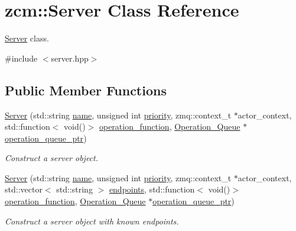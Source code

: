 \hypertarget{classzcm_1_1Server}{\section{zcm\-:\-:Server Class Reference}
\label{classzcm_1_1Server}
}


\hyperlink{classzcm_1_1Server}{Server} class.  




{\ttfamily \#include $<$server.\-hpp$>$}

\subsection*{Public Member Functions}
\begin{DoxyCompactItemize}
\item 
\hyperlink{classzcm_1_1Server_a3b672b6fdb377ffe5f478a9c7916acbb}{Server} (std\-::string \hyperlink{classzcm_1_1Server_a9d59737b196a7abb3a891dc8723e0dcf}{name}, unsigned int \hyperlink{classzcm_1_1Server_ad088a068dc025ff7aa4bf560cc7c43c1}{priority}, zmq\-::context\-\_\-t $\ast$actor\-\_\-context, std\-::function$<$ void()$>$ \hyperlink{classzcm_1_1Server_a98a640c77898790e3ad10b3276e3cba8}{operation\-\_\-function}, \hyperlink{classzcm_1_1Operation__Queue}{Operation\-\_\-\-Queue} $\ast$\hyperlink{classzcm_1_1Server_a667c0fef537aa6acc6245d956250c860}{operation\-\_\-queue\-\_\-ptr})
\begin{DoxyCompactList}\small\item\em Construct a server object. \end{DoxyCompactList}\item 
\hyperlink{classzcm_1_1Server_af1dd8cc020d636884884eaefcdcc857b}{Server} (std\-::string \hyperlink{classzcm_1_1Server_a9d59737b196a7abb3a891dc8723e0dcf}{name}, unsigned int \hyperlink{classzcm_1_1Server_ad088a068dc025ff7aa4bf560cc7c43c1}{priority}, zmq\-::context\-\_\-t $\ast$actor\-\_\-context, std\-::vector$<$ std\-::string $>$ \hyperlink{classzcm_1_1Server_a488d1398b76851565a4d116f7cf72af1}{endpoints}, std\-::function$<$ void()$>$ \hyperlink{classzcm_1_1Server_a98a640c77898790e3ad10b3276e3cba8}{operation\-\_\-function}, \hyperlink{classzcm_1_1Operation__Queue}{Operation\-\_\-\-Queue} $\ast$\hyperlink{classzcm_1_1Server_a667c0fef537aa6acc6245d956250c860}{operation\-\_\-queue\-\_\-ptr})
\begin{DoxyCompactList}\small\item\em Construct a server object with known endpoints. \end{DoxyCompactList}\item 

\end{DoxyCompactItemize}
